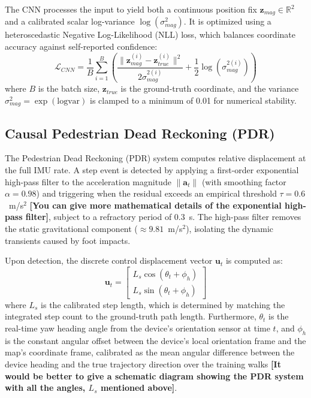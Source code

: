 \documentclass[conference]{IEEEtran}
\begin{document}
The CNN processes the input to yield both a continuous position fix $\mathbf{z}_{mag} \in \mathbb{R}^2$ and a calibrated scalar log-variance $\log(\sigma^2_{mag})$. It is optimized using a heteroscedastic Negative Log-Likelihood (NLL) loss, which balances coordinate accuracy against self-reported confidence:
\begin{equation}
\mathcal{L}_{CNN} = \frac{1}{B} \sum_{i=1}^{B} \left( \frac{\| \mathbf{z}_{mag}^{(i)} - \mathbf{z}_{true}^{(i)} \|^2}{2\sigma^{2(i)}_{mag}} + \frac{1}{2}\log(\sigma^{2(i)}_{mag}) \right) \label{eq:nll_loss}
\end{equation}
where $B$ is the batch size, $\mathbf{z}_{true}$ is the ground-truth coordinate, and the variance $\sigma^2_{mag} = \exp(\text{logvar})$ is clamped to a minimum of 0.01 for numerical stability.

\subsection{Causal Pedestrian Dead Reckoning (PDR)}

The Pedestrian Dead Reckoning (PDR) system computes relative displacement at the full IMU rate. A step event is detected by applying a first-order exponential high-pass filter to the acceleration magnitude $\|\mathbf{a}_t\|$ (with smoothing factor $\alpha = 0.98$) and triggering when the residual exceeds an empirical threshold $\tau = 0.6$~m/s$^2$ \textbf{\color{red}[You can give more mathematical details of the exponential high-pass filter]}, subject to a refractory period of 0.3~s. The high-pass filter removes the static gravitational component ($\approx 9.81$~m/s$^2$), isolating the dynamic transients caused by foot impacts.

Upon detection, the discrete control displacement vector $\mathbf{u}_t$ is computed as:
\begin{equation}
\mathbf{u}_t = \begin{bmatrix} L_s \cos(\theta_t + \phi_h) \\ L_s \sin(\theta_t + \phi_h) \end{bmatrix} \label{eq:pdr}
\end{equation}
where $L_s$ is the calibrated step length, which is determined by matching the integrated step count to the ground-truth path length. Furthermore, $\theta_t$ is the real-time yaw heading angle from the device's orientation sensor at time $t$, and $\phi_h$ is the constant angular offset between the device's local orientation frame and the map's coordinate frame, calibrated as the mean angular difference between the device heading and the true trajectory direction over the training walks \textbf{\color{red}[It would be better to give a schematic diagram showing the PDR system with all the angles, $L_s$ mentioned above]}. 
\end{document}
